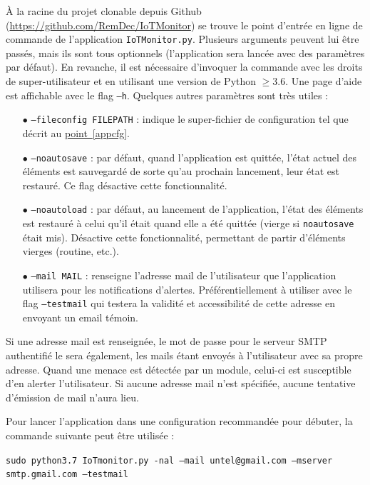 \documentclass[]{article}
\newcommand{\wordlink}[2]{\hyperref[#1]{#2~\ref{#1}}}
\begin{document}
À la racine du projet clonable depuis Github (\url{https://github.com/RemDec/IoTMonitor}) se trouve le point d'entrée en ligne de commande de l'application \texttt{IoTMonitor.py}. Plusieurs arguments peuvent lui être passés, mais ils sont tous optionnels (l'application sera lancée avec des paramètres par défaut). En revanche, il est nécessaire d'invoquer la commande avec les droits de super-utilisateur et en utilisant une version de Python $\geq 3.6$. Une page d'aide est affichable avec le flag \texttt{--h}. Quelques autres paramètres sont très utiles :\\
\begin{itemize}
\item[$\bullet$] \texttt{--fileconfig FILEPATH} : indique le super-fichier de configuration tel que décrit au \wordlink{appcfg}{point}.
\vspace{0.2cm}
\item[$\bullet$] \texttt{--noautosave} : par défaut, quand l'application est quittée, l'état actuel des éléments est sauvegardé de sorte qu'au prochain lancement, leur état est restauré. Ce flag désactive cette fonctionnalité.
\vspace{0.2cm}
\item[$\bullet$] \texttt{--noautoload} : par défaut, au lancement de l'application, l'état des éléments est restauré à celui qu'il était quand elle a été quittée (vierge si \texttt{noautosave} était mis). Désactive cette fonctionnalité, permettant de partir d'éléments vierges (routine, etc.).
\vspace{0.2cm}
\item[$\bullet$] \texttt{--mail MAIL} : renseigne l'adresse mail de l'utilisateur que l'application utilisera pour les notifications d'alertes. Préférentiellement à utiliser avec le flag \texttt{--testmail} qui testera la validité et accessibilité de cette adresse en envoyant un email témoin.
\end{itemize}
\vspace{0.2cm}

\par Si une adresse mail est renseignée, le mot de passe pour le serveur SMTP authentifié le sera également, les mails étant envoyés à l'utilisateur avec sa propre adresse. Quand une menace est détectée par un module, celui-ci est susceptible d'en alerter l'utilisateur. Si aucune adresse mail n'est spécifiée, aucune tentative d'émission de mail n'aura lieu.\\

\par Pour lancer l'application dans une configuration recommandée pour débuter, la commande suivante peut être utilisée :
\begin{center}
\texttt{sudo python3.7 IoTmonitor.py -nal --mail untel@gmail.com --mserver smtp.gmail.com --testmail}
\end{center} 
\end{document}
